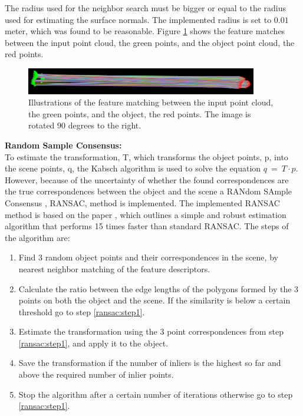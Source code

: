 \documentclass[../main.tex]{subfiles}
\begin{document}
The radius used for the neighbor search must be bigger or equal to the radius used for estimating the surface normals. The implemented radius is set to $0.01$ meter, which was found to be reasonable. Figure \ref{fig:feature_matching} shows the feature matches between the input point cloud, the green points, and the object point cloud, the red points.
\begin{figure}[H]
    \centering
    \includegraphics[width=0.9\textwidth]{figures/simulated_depth_sensor/global/feature_matching.png}
    \caption{Illustrations of the feature matching between the input point cloud, the green points, and the object, the red points. The image is rotated 90 degrees to the right.}
    \label{fig:feature_matching}
\end{figure}
\textbf{Random Sample Consensus:}\\
To estimate the transformation, T, which transforms the object points, p, into the scene points, q, the Kabsch algorithm \cite{kabsch_algorithm} is used to solve the equation $q\ =\ T \cdot p$. However, because of the uncertainty of whether the found correspondences are the true correspondences between the object and the scene a RANdom SAmple Consensus \cite{RANSAC}, RANSAC, method is implemented. The implemented RANSAC method is based on the paper \cite{buch2013pose}, which outlines a simple and robust estimation algorithm that performs 15 times faster than standard RANSAC. The steps of the algorithm are:
\begin{enumerate}
    \item \label{ransac:step1} Find 3 random object points and their correspondences in the scene, by nearest neighbor matching of the feature descriptors.
    \item Calculate the ratio between the edge lengths of the polygons formed by the 3 points on both the object and the scene. If the similarity is below a certain threshold go to step \ref{ransac:step1}.
    \item Estimate the transformation using the 3 point correspondences from step \ref{ransac:step1}, and apply it to the object.
    \item Save the transformation if the number of inliers is the highest so far and above the required number of inlier points.
    \item Stop the algorithm after a certain number of iterations otherwise go to step \ref{ransac:step1}.
\end{enumerate}
\end{document}
